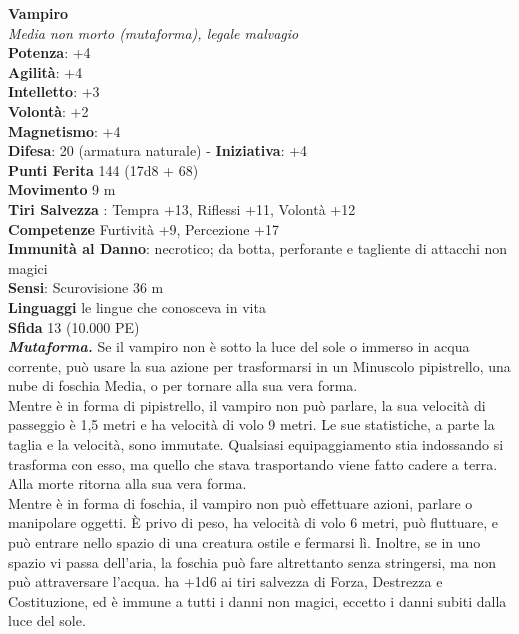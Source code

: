 \begin{multicols}{2}
\medskip\textbf{Vampiro}\\
\emph{Media non morto (mutaforma), legale malvagio}\\
\textbf{Potenza}: +4\\
\textbf{Agilità}: +4\\
\textbf{Intelletto}: +3\\
\textbf{Volontà}: +2\\
\textbf{Magnetismo}: +4\\
\textbf{Difesa}: 20 (armatura naturale) - \textbf{Iniziativa}: +4\\
\textbf{Punti Ferita} 144 (17d8 + 68)\\
\textbf{Movimento} 9 m\\
\textbf{Tiri Salvezza} : Tempra +13, Riflessi +11, Volontà +12\\
\textbf{Competenze} Furtività +9, Percezione +17\\
\textbf{Immunità al Danno}: necrotico; da botta, perforante e tagliente di attacchi non magici\\
\textbf{Sensi}: Scurovisione 36 m\\
\textbf{Linguaggi} le lingue che conosceva in vita\\
\textbf{Sfida} 13 (10.000 PE)\smallskip\\

\emph{\textbf{Mutaforma.}} Se il vampiro non è sotto la luce del sole o immerso in acqua corrente, può usare la sua azione per trasformarsi in un Minuscolo pipistrello, una nube di foschia Media, o per tornare alla sua vera forma.\\
Mentre è in forma di pipistrello, il vampiro non può parlare, la sua velocità di passeggio è 1,5 metri e ha velocità di volo 9 metri. Le sue statistiche, a parte la taglia e la velocità, sono immutate. Qualsiasi equipaggiamento stia indossando si trasforma con esso, ma quello che stava trasportando viene fatto cadere a terra. Alla morte ritorna alla sua vera forma.\\

Mentre è in forma di foschia, il vampiro non può effettuare azioni, parlare o manipolare oggetti. È privo di peso, ha velocità di volo 6 metri, può fluttuare, e può entrare nello spazio di una creatura ostile e fermarsi lì. Inoltre, se in uno spazio vi passa dell'aria, la foschia può fare altrettanto senza stringersi, ma non può attraversare l'acqua. ha +1d6 ai tiri salvezza di Forza, Destrezza e Costituzione, ed è immune a tutti i danni non magici, eccetto i danni subiti dalla luce del sole.\\


\end{multicols}

